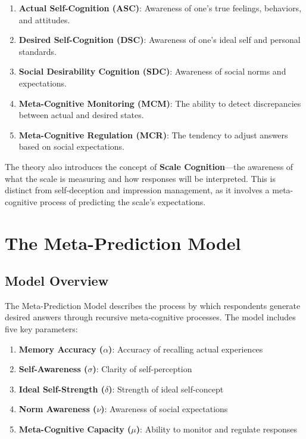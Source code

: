 \documentclass[10pt,twocolumn]{article}
\begin{document}
\begin{enumerate}
    \item \textbf{Actual Self-Cognition (ASC)}: Awareness of one's true feelings, behaviors, and attitudes.
    \item \textbf{Desired Self-Cognition (DSC)}: Awareness of one's ideal self and personal standards.
    \item \textbf{Social Desirability Cognition (SDC)}: Awareness of social norms and expectations.
    \item \textbf{Meta-Cognitive Monitoring (MCM)}: The ability to detect discrepancies between actual and desired states.
    \item \textbf{Meta-Cognitive Regulation (MCR)}: The tendency to adjust answers based on social expectations.
\end{enumerate}

The theory also introduces the concept of \textbf{Scale Cognition}---the awareness of what the scale is measuring and how responses will be interpreted. This is distinct from self-deception and impression management, as it involves a meta-cognitive process of predicting the scale's expectations.


\section{The Meta-Prediction Model}

\subsection{Model Overview}

The Meta-Prediction Model describes the process by which respondents generate desired answers through recursive meta-cognitive processes. The model includes five key parameters:

\begin{enumerate}
    \item \textbf{Memory Accuracy ($\alpha$)}: Accuracy of recalling actual experiences
    \item \textbf{Self-Awareness ($\sigma$)}: Clarity of self-perception
    \item \textbf{Ideal Self-Strength ($\delta$)}: Strength of ideal self-concept
    \item \textbf{Norm Awareness ($\nu$)}: Awareness of social expectations
    \item \textbf{Meta-Cognitive Capacity ($\mu$)}: Ability to monitor and regulate responses
\end{enumerate}
\end{document}
